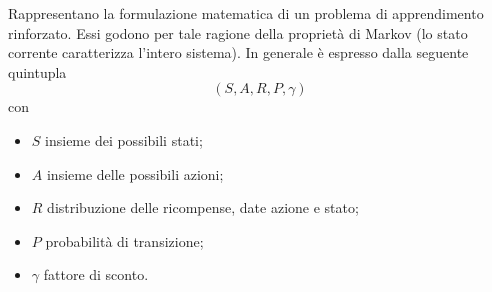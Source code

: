 \documentclass{subfiles}
\begin{document}
Rappresentano la formulazione matematica di un problema di apprendimento rinforzato.
Essi godono per tale ragione della proprietà di Markov (lo stato corrente caratterizza l'intero sistema).
In generale è espresso dalla seguente quintupla
\[
    (S, A, R, P, \gamma)
\]
con
\begin{itemize}
    \item \(S\) insieme dei possibili stati;
    \item \(A\) insieme delle possibili azioni;
    \item \(R\) distribuzione delle ricompense, date azione e stato;
    \item \(P\) probabilità di transizione;
    \item \(\gamma\) fattore di sconto.
\end{itemize}
\end{document}
